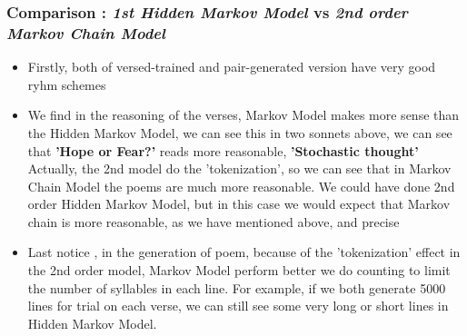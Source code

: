 \subsubsection{Comparison : \textit{1st Hidden Markov Model} vs \textit{2nd order Markov Chain Model}}
\begin{itemize}
	\item Firstly, both of versed-trained and pair-generated version have very good ryhm schemes
	\item We find in the reasoning of the verses, Markov Model makes more sense than the Hidden Markov Model, we can see this in two sonnets above, we can see that \textbf{'Hope or Fear?'} reads more reasonable, \textbf{'Stochastic thought'} Actually,  the 2nd model do the 'tokenization', so we can see that in Markov Chain Model the poems are much more reasonable. We could have done 2nd order Hidden Markov Model, but in this case we would expect that Markov chain is more reasonable, as we have mentioned above, and precise
	\item Last notice , in the generation of poem, because of the 'tokenization' effect in the 2nd order model, Markov Model perform better we do counting to limit the number of syllables in each line. For example, if we both generate 5000 lines for trial on each verse, we can still see some very long or short lines in Hidden Markov Model. 
\end{itemize}